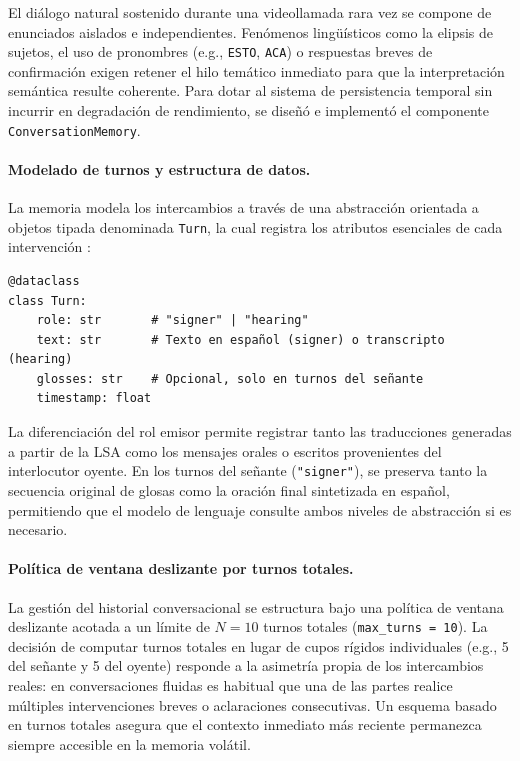El diálogo natural sostenido durante una videollamada rara vez se compone de enunciados aislados e independientes. Fenómenos lingüísticos como la elipsis de sujetos, el uso de pronombres (e.g., \texttt{ESTO}, \texttt{ACA}) o respuestas breves de confirmación exigen retener el hilo temático inmediato para que la interpretación semántica resulte coherente. Para dotar al sistema de persistencia temporal sin incurrir en degradación de rendimiento, se diseñó e implementó el componente \texttt{ConversationMemory}.

\paragraph{Modelado de turnos y estructura de datos.}
La memoria modela los intercambios a través de una abstracción orientada a objetos tipada denominada \texttt{Turn}, la cual registra los atributos esenciales de cada intervención \parencite{gamma1994design}:
\begin{verbatim}
@dataclass
class Turn:
    role: str       # "signer" | "hearing"
    text: str       # Texto en español (signer) o transcripto (hearing)
    glosses: str    # Opcional, solo en turnos del señante
    timestamp: float
\end{verbatim}

La diferenciación del rol emisor permite registrar tanto las traducciones generadas a partir de la LSA como los mensajes orales o escritos provenientes del interlocutor oyente. En los turnos del señante (\texttt{"signer"}), se preserva tanto la secuencia original de glosas como la oración final sintetizada en español, permitiendo que el modelo de lenguaje consulte ambos niveles de abstracción si es necesario.

\paragraph{Política de ventana deslizante por turnos totales.}
La gestión del historial conversacional se estructura bajo una política de ventana deslizante acotada a un límite de $N = 10$ turnos totales (\texttt{max\_turns = 10}). La decisión de computar turnos totales en lugar de cupos rígidos individuales (e.g., 5 del señante y 5 del oyente) responde a la asimetría propia de los intercambios reales: en conversaciones fluidas es habitual que una de las partes realice múltiples intervenciones breves o aclaraciones consecutivas. Un esquema basado en turnos totales asegura que el contexto inmediato más reciente permanezca siempre accesible en la memoria volátil.

